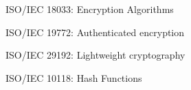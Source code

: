 
ISO/IEC 18033: Encryption Algorithms

ISO/IEC 19772: Authenticated encryption

ISO/IEC 29192: Lightweight cryptography

ISO/IEC 10118: Hash Functions